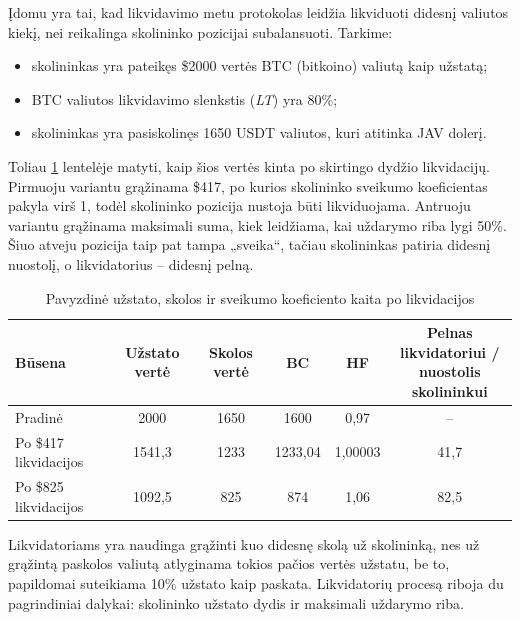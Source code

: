 \documentclass{VUMIFPSkursinis}
\begin{document}
Įdomu yra tai, kad likvidavimo metu protokolas leidžia likviduoti didesnį valiutos kiekį, nei reikalinga skolininko pozicijai subalansuoti. Tarkime:
\begin{itemize}
  \item skolininkas yra pateikęs \$2000 vertės BTC (bitkoino) valiutą kaip užstatą;
  \item BTC valiutos likvidavimo slenkstis (\textit{LT}) yra 80\%;
  \item skolininkas yra pasiskolinęs 1650 USDT valiutos, kuri atitinka JAV dolerį.
\end{itemize}

Toliau \ref{tab:likvidacijos_pav} lentelėje matyti, kaip šios vertės kinta po skirtingo dydžio likvidacijų.
Pirmuoju variantu grąžinama \$417, po kurios skolininko sveikumo koeficientas pakyla virš 1, todėl
skolininko pozicija nustoja būti likviduojama.
Antruoju variantu grąžinama maksimali suma, kiek leidžiama, kai uždarymo riba lygi 50\%.
Šiuo atveju pozicija taip pat tampa „sveika“, tačiau skolininkas patiria didesnį nuostolį, o likvidatorius – didesnį pelną.

\begin{table}[h!]
  \centering
  \begin{tabular}{lccccc}
  \hline
  \textbf{Būsena} 
  & \textbf{Užstato vertė}
  & \textbf{Skolos vertė}
  & \textbf{BC}
  & \textbf{HF}
  & \makecell{\textbf{Pelnas likvidatoriui /}\\ \textbf{nuostolis skolininkui}} \\ 
  \hline
  Pradinė                
  & 2000      
  & 1650      
  & 1600      
  & 0,97    
  & --         \\
  
  Po \$417 likvidacijos  
  & 1541,3    
  & 1233      
  & 1233,04   
  & 1,00003   
  & 41,7       \\
  
  Po \$825 likvidacijos  
  & 1092,5    
  & 825       
  & 874       
  & 1,06      
  & 82,5       \\
  \hline
  \end{tabular}
  \caption{Pavyzdinė užstato, skolos ir sveikumo koeficiento kaita po likvidacijos}
  \label{tab:likvidacijos_pav}
  \end{table}

Likvidatoriams yra naudinga grąžinti kuo didesnę skolą už skolininką, nes už grąžintą paskolos valiutą atlyginama tokios pačios vertės užstatu, be to, papildomai suteikiama 10\% užstato kaip paskata. Likvidatorių procesą riboja du pagrindiniai dalykai: skolininko užstato dydis ir maksimali uždarymo riba.
\end{document}
